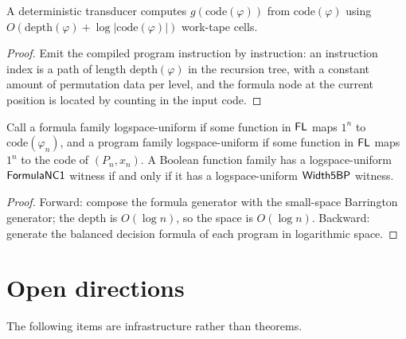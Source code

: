 \begin{lemma}
  \label{lem:circuits-barrington-codegen-space}
  A deterministic transducer computes $g(\mathrm{code}(\varphi))$ from
  $\mathrm{code}(\varphi)$ using
  $O(\mathrm{depth}(\varphi) + \log |\mathrm{code}(\varphi)|)$ work-tape
  cells.
\end{lemma}
\begin{proof}
  Emit the compiled program instruction by instruction: an instruction index
  is a path of length $\mathrm{depth}(\varphi)$ in the recursion tree, with a
  constant amount of permutation data per level, and the formula node at the
  current position is located by counting in the input code.
\end{proof}

\begin{theorem}
  \label{thm:circuits-uniform-barrington}
  \notready
  Call a formula family logspace-uniform if some function in $\mathsf{FL}$ maps
  $1^n$ to $\mathrm{code}(\varphi_n)$, and a program family logspace-uniform if
  some function in $\mathsf{FL}$ maps $1^n$ to the code of $(P_n, x_n)$. A Boolean
  function family has a logspace-uniform $\mathsf{FormulaNC1}$ witness if and only
  if it has a logspace-uniform $\mathsf{Width5BP}$ witness.
\end{theorem}
\begin{proof}
  Forward: compose the formula generator with the small-space Barrington
  generator; the depth is $O(\log n)$, so the space is $O(\log n)$.
  Backward: generate the balanced decision formula of each program in
  logarithmic space.
\end{proof}

\section{Open directions}
\label{sec:circuits-open}

The following items are infrastructure rather than theorems.


